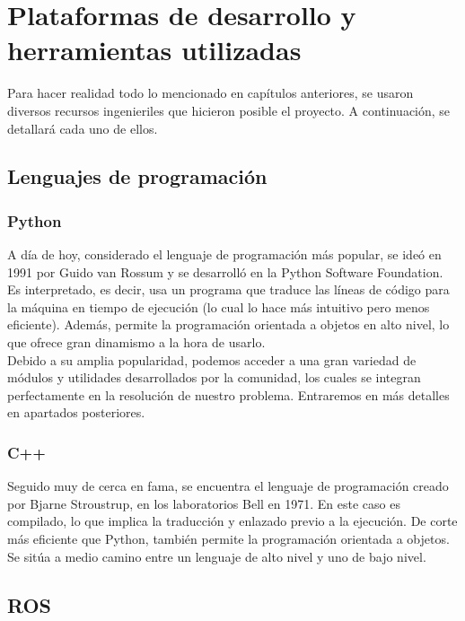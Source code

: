 \chapter{Plataformas de desarrollo y herramientas utilizadas}
\label{cap:capitulo3}

Para hacer realidad todo lo mencionado en capítulos anteriores, se usaron diversos recursos ingenieriles que hicieron posible el proyecto. A continuación, se detallará cada uno de ellos.

\section{Lenguajes de programación}
\label{sec:lenguajes_programacion}

\subsection{Python}
\label{subsec:python}

A día de hoy, considerado el lenguaje de programación más popular, se ideó en 1991 por Guido van Rossum y se desarrolló en la Python Software Foundation. Es interpretado, es decir, usa un programa que traduce las líneas de código para la máquina en tiempo de ejecución (lo cual lo hace más intuitivo pero menos eficiente). Además, permite la programación orientada a objetos en alto nivel, lo que ofrece gran dinamismo a la hora de usarlo.\\

Debido a su amplia popularidad, podemos acceder a una gran variedad de módulos y utilidades desarrollados por la comunidad, los cuales se integran perfectamente en la resolución de nuestro problema. Entraremos en más detalles en apartados posteriores.

\subsection{C++}
\label{subsec:cplusplus}

Seguido muy de cerca en fama, se encuentra el lenguaje de programación creado por Bjarne Stroustrup, en los laboratorios Bell en 1971. En este caso es compilado, lo que implica la traducción y enlazado previo a la ejecución. De corte más eficiente que Python, también permite la programación orientada a objetos. Se sitúa a medio camino entre un lenguaje de alto nivel y uno de bajo nivel.\\

\section{\ac{ROS}}
\label{sec:ros}

